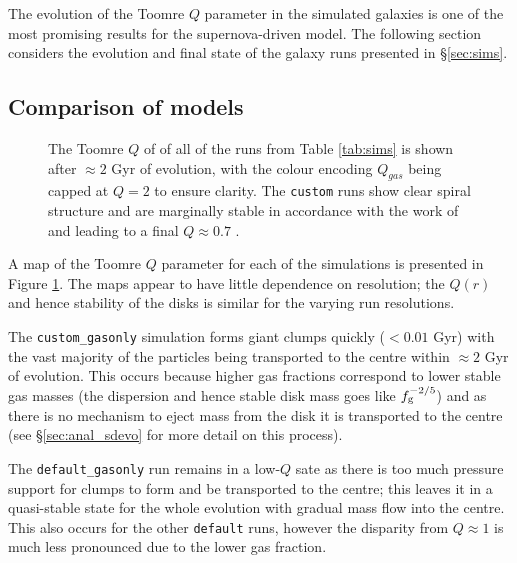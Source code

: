The evolution of the Toomre $Q$ parameter in the simulated galaxies is one of the most promising results for the supernova-driven model.
The following section considers the evolution and final state of the galaxy runs presented in \S \ref{sec:sims}.

\subsection{Comparison of models}

\begin{figure}[!ht]
    \leavevmode\rlap{\usebox{\graphicsbox}}%
    \begin{minipage}[b]{0.63\wd\graphicsbox}%
        \caption{The Toomre $Q$ of of all of the runs from Table \ref{tab:sims} is shown after $\approx 2$ Gyr of evolution, with the colour encoding $Q_{gas}$ being capped at $Q=2$ to ensure clarity. The {\tt custom} runs show clear spiral structure and are marginally stable in accordance with the work of \citet{hopkins_stellar_2012} and \citep{behrendt_structure_2015} leading to a final $Q \approx 0.7$ .}
        \label{fig:toomqsimbigfig}
    \end{minipage}\hspace*{0.33\wd\graphicsbox}%
\end{figure}

A map of the Toomre $Q$ parameter for each of the simulations is presented in Figure \ref{fig:toomqsimbigfig}.
The maps appear to have little dependence on resolution; the $Q(r)$ and hence stability of the disks is similar for the varying run resolutions.

The {\tt custom\_gasonly} simulation forms giant clumps quickly ($<0.01$ Gyr) with the vast majority of the particles being transported to the centre within $\approx 2$ Gyr of evolution.
This occurs because higher gas fractions correspond to lower stable gas masses (the dispersion and hence stable disk mass goes like $f_\mathrm{g}^{-2/5}$) and as there is no mechanism to eject mass from the disk it is transported to the centre (see \S \ref{sec:anal_sdevo} for more detail on this process).

The {\tt default\_gasonly} run remains in a low-$Q$ sate as there is too much pressure support for clumps to form and be transported to the centre; this leaves it in a quasi-stable state for the whole evolution with gradual mass flow into the centre.
This also occurs for the other {\tt default} runs, however the disparity from $Q \approx 1$ is much less pronounced due to the lower gas fraction.

